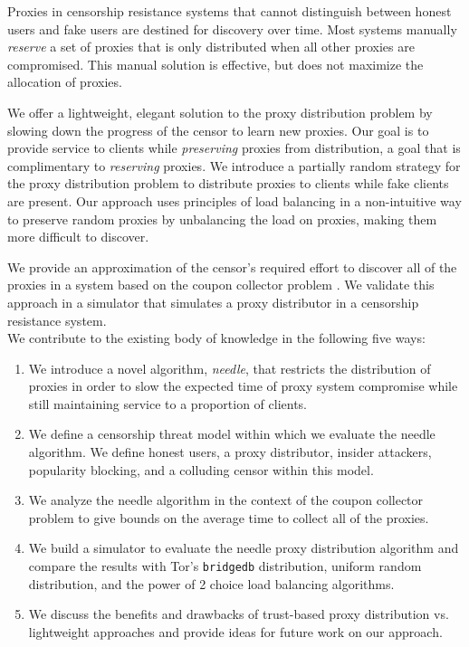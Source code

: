 Proxies in censorship resistance systems that cannot distinguish between honest users and fake users are destined for discovery over time. Most systems manually \textit{reserve} a set of proxies that is only distributed when all other proxies are compromised. This manual solution is effective, but does not maximize the allocation of proxies. 

We offer a lightweight, elegant solution to the proxy distribution problem by slowing down the progress of the censor to learn new proxies. Our goal is to provide service to clients while \textit{preserving} proxies from distribution, a goal that is complimentary to \textit{reserving} proxies. We introduce a partially random strategy for the proxy distribution problem to distribute proxies to clients while fake clients are present. Our approach uses principles of load balancing in a non-intuitive way to preserve random proxies by unbalancing the load on proxies, making them more difficult to discover. 

We provide an approximation of the censor's required effort to discover all of the proxies in a system based on the coupon collector problem \cite{flajolet1992birthday}. We validate this approach in a simulator that simulates a proxy distributor in a censorship resistance system. \\

We contribute to the existing body of knowledge in the following five ways:
\begin{enumerate}
    \item We introduce a novel algorithm, \emph{needle}, that restricts the distribution of proxies in order to slow the expected time of proxy system compromise while still maintaining service to a proportion of clients.
    \item We define a censorship threat model within which we evaluate the needle algorithm. We define honest users, a proxy distributor, insider attackers, popularity blocking, and a colluding censor within this model.
    \item We analyze the needle algorithm in the context of the coupon collector problem to give bounds on the average time to collect all of the proxies.
    \item We build a simulator to evaluate the needle proxy distribution algorithm and compare the results with Tor's \texttt{bridgedb} distribution, uniform random distribution, and the power of 2 choice load balancing algorithms. 
    \item We discuss the benefits and drawbacks of trust-based proxy distribution vs. lightweight approaches and provide ideas for future work on our approach.
\end{enumerate}
